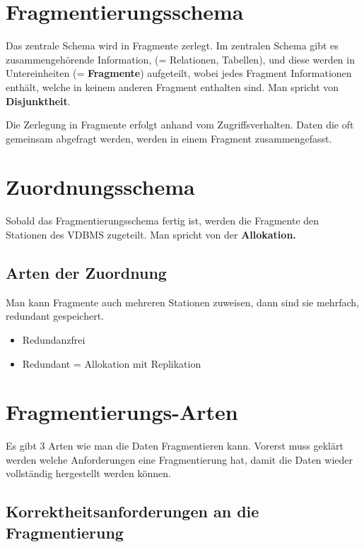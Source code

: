 \section{Fragmentierungsschema}

Das zentrale Schema wird in Fragmente zerlegt. Im zentralen Schema gibt es zusammengehörende Information, (= Relationen, Tabellen), und diese werden in Untereinheiten (= \textbf{Fragmente}) aufgeteilt, wobei jedes Fragment Informationen enthält, welche in keinem anderen Fragment enthalten sind. Man spricht von \textbf{Disjunktheit}.

Die Zerlegung in Fragmente erfolgt anhand vom Zugriffsverhalten. Daten die oft gemeinsam abgefragt werden, werden in einem Fragment zusammengefasst. 

\section{Zuordnungsschema}

Sobald das Fragmentierungsschema fertig ist, werden die Fragmente den Stationen des VDBMS zugeteilt. Man spricht von der \textbf{Allokation.}

\subsection{Arten der Zuordnung}

Man kann Fragmente auch mehreren Stationen zuweisen, dann sind sie mehrfach, redundant gespeichert.

\begin{itemize}
    \item Redundanzfrei
    \item Redundant = Allokation mit Replikation
\end{itemize}

\section{Fragmentierungs-Arten}

Es gibt 3 Arten wie man die Daten Fragmentieren kann. Vorerst muss geklärt werden welche Anforderungen eine Fragmentierung hat, damit die Daten wieder vollständig hergestellt werden können.

\subsection{Korrektheitsanforderungen an die Fragmentierung}

